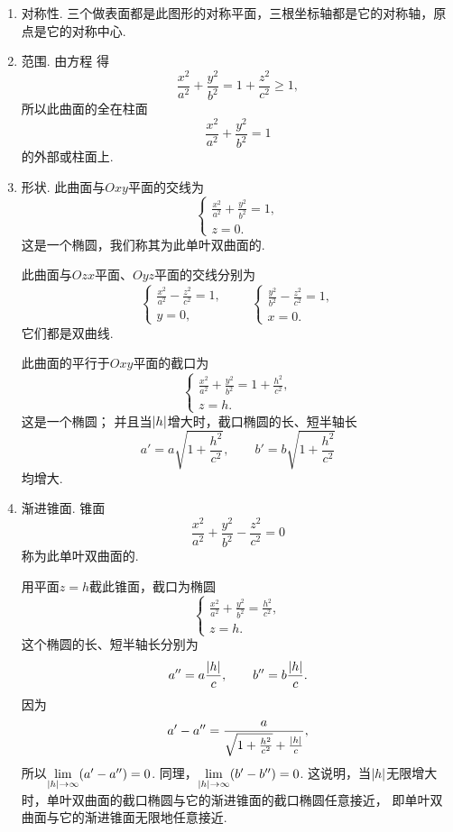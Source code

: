 \begin{enumerate}
	\item 对称性.
	三个做表面都是此图形的对称平面，三根坐标轴都是它的对称轴，原点是它的对称中心.

	\item 范围.
	由方程  得\[
		\frac{x^2}{a^2}+\frac{y^2}{b^2}=1+\frac{z^2}{c^2}\geqslant1,
	\]
	所以此曲面的全在柱面\[
		\frac{x^2}{a^2}+\frac{y^2}{b^2}=1
	\]的外部或柱面上.

	\item 形状.
	此曲面与\(Oxy\)平面的交线为\[
		\left\{ \begin{array}{l}
			\frac{x^2}{a^2}+\frac{y^2}{b^2}=1, \\
			z = 0.
		\end{array} \right.
	\]
	这是一个椭圆，我们称其为此单叶双曲面的.

	此曲面与\(Ozx\)平面、\(Oyz\)平面的交线分别为\[
		\left\{ \begin{array}{l}
			\frac{x^2}{a^2}-\frac{z^2}{c^2}=1, \\
			y = 0,
		\end{array} \right.
		\qquad
		\left\{ \begin{array}{l}
			\frac{y^2}{b^2}-\frac{z^2}{c^2}=1, \\
			x = 0.
		\end{array} \right.
	\]
	它们都是双曲线.

	此曲面的平行于\(Oxy\)平面的截口为\[
		\left\{ \begin{array}{l}
			\frac{x^2}{a^2}+\frac{y^2}{b^2}=1+\frac{h^2}{c^2}, \\
			z = h.
		\end{array} \right.
	\]
	这是一个椭圆；
	并且当\(\abs{h}\)增大时，截口椭圆的长、短半轴长\[
		a' = a \sqrt{1+\frac{h^2}{c^2}}, \qquad
		b' = b \sqrt{1+\frac{h^2}{c^2}}
	\]均增大.

	\item 渐进锥面.
	锥面\begin{equation}
		\frac{x^2}{a^2}+\frac{y^2}{b^2}-\frac{z^2}{c^2}=0
	\end{equation}
	称为此单叶双曲面的.

	用平面\(z=h\)截此锥面，截口为椭圆\[
		\left\{ \begin{array}{l}
			\frac{x^2}{a^2}+\frac{y^2}{b^2}=\frac{h^2}{c^2}, \\
			z = h.
		\end{array} \right.
	\]
	这个椭圆的长、短半轴长分别为\[
		a'' = a \frac{\abs{h}}{c}, \qquad
		b'' = b \frac{\abs{h}}{c}.
	\]
	因为\[
		a' - a'' = \frac{a}{\sqrt{1+\frac{h^2}{c^2}}+\frac{\abs{h}}{c}},
	\]
	所以\(\lim\limits_{\abs{h}\to\infty}(a'-a'')=0\).
	同理，\(\lim\limits_{\abs{h}\to\infty}(b'-b'')=0\).
	这说明，当\(\abs{h}\)无限增大时，单叶双曲面的截口椭圆与它的渐进锥面的截口椭圆任意接近，
	即单叶双曲面与它的渐进锥面无限地任意接近.
\end{enumerate}

